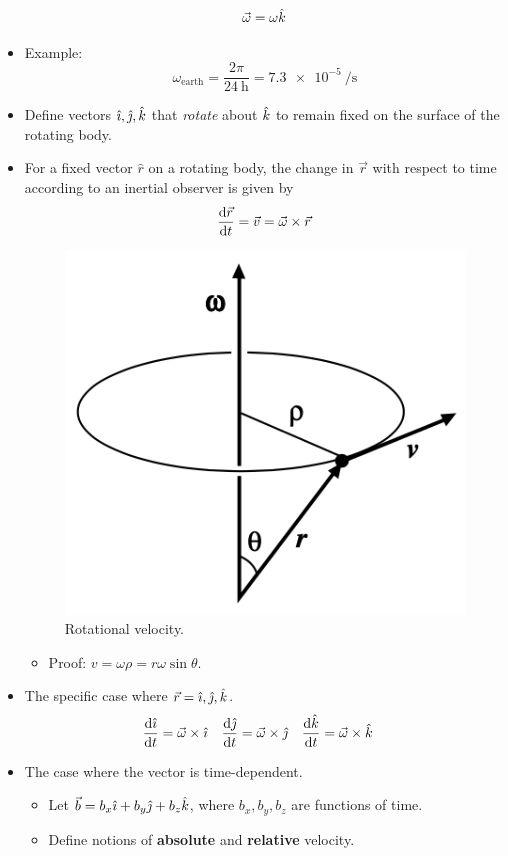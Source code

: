 \documentclass[../notes.tex]{subfiles}
\begin{document}
\begin{itemize}
    \begin{equation*}
        \vec{\omega} = \omega\hat{k}
    \end{equation*}
    \item Example:
    \begin{equation*}
        \omega_\text{earth} = \frac{2\pi}{\SI{24}{\hour}}
        = \SI{7.3e-5}{\per\second}
    \end{equation*}
    \item Define vectors $\hat{\imath},\hat{\jmath},\hat{k}$ that \emph{rotate} about $\hat{k}$ to remain fixed on the surface of the rotating body.
    \item For a fixed vector $\hat{r}$ on a rotating body, the change in $\vec{r}$ with respect to time according to an inertial observer is given by
    \begin{equation*}
        \dv{\vec{r}}{t} = \vec{v}
        = \vec{\omega}\times\vec{r}
    \end{equation*}
    \begin{figure}[h!]
        \centering
        \includegraphics[width=0.25\linewidth]{../ExtFiles/Vrotation.png}
        \caption{Rotational velocity.}
        \label{fig:Vrotation}
    \end{figure}
    \begin{itemize}
        \item Proof: $v=\omega\rho=r\omega\sin\theta$.
    \end{itemize}
    \item The specific case where $\vec{r}=\hat{\imath},\hat{\jmath},\hat{k}$.
    \begin{align*}
        \dv{\hat{\imath}}{t} &= \vec{\omega}\times\hat{\imath}&
        \dv{\hat{\jmath}}{t} &= \vec{\omega}\times\hat{\jmath}&
        \dv{\hat{k}}{t} &= \vec{\omega}\times\hat{k}
    \end{align*}
    \item The case where the vector is time-dependent.
    \begin{itemize}
        \item Let $\vec{b}=b_x\hat{\imath}+b_y\hat{\jmath}+b_z\hat{k}$, where $b_x,b_y,b_z$ are functions of time.
        \item Define notions of \textbf{absolute} and \textbf{relative} velocity.

\end{itemize}
\end{itemize}
\end{document}
